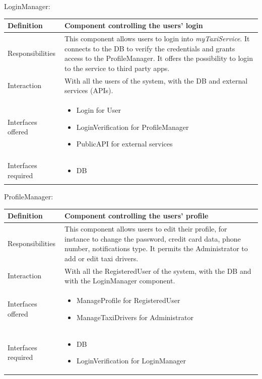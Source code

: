 \documentclass[a4paper,11pt]{report} %
\newcommand{\mts}{\mbox{\normalfont\itshape myTaxiService}}
\begin{document}
	\pagebreak
		
	LoginManager:		
	\begin{center}
		\begin{tabular}{| l | p{9cm} |}\hline
			Definition & Component controlling the users' login\\\hline
			Responsibilities & This component allows users to login into \mts{}. It connects to the DB to verify the credentials and grants access to the ProfileManager. It offers the possibility to login to the service to third party apps.\\\hline
			Interaction & With all the users of the system, with the DB and external services (APIs).\\\hline
			Interfaces offered & \begin{itemize}
				\item Login for User
				\item LoginVerification for ProfileManager
				\item PublicAPI for external services
			\end{itemize}\\\hline
			Interfaces required & \begin{itemize}
				\item DB 
			\end{itemize}\\\hline
		\end{tabular}
	\end{center}
	\bigskip
	\bigskip
	
	ProfileManager:
	\begin{center}
		\begin{tabular}{| l | p{9cm} |}\hline
			Definition & Component controlling the users' profile\\\hline
			Responsibilities & This component allows users to edit their profile, for instance to change the password, credit card data, phone number, notifications type. It permits the Administrator to add or edit taxi drivers.\\\hline
			Interaction & With all the RegisteredUser of the system, with the DB and with the LoginManager component.\\\hline
			Interfaces offered & \begin{itemize}
				\item ManageProfile for RegisteredUser
				\item ManageTaxiDrivers for Administrator
			\end{itemize}\\\hline
			Interfaces required & \begin{itemize}
				\item DB
				\item LoginVerification for LoginManager
			\end{itemize}\\\hline
		\end{tabular}
	\end{center}
	
\end{document}
